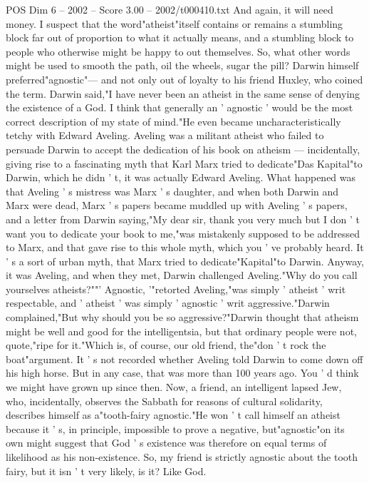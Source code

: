 \begin{textsample}{POS Dim 6 – 2002 – Score 3.00 – 2002/t000410.txt}
And again, it will need money.
I suspect that the word"atheist"itself contains or remains a stumbling block far out of proportion to what it actually means, and a stumbling block to people who otherwise might be happy to out themselves.
So, what other words might be used to smooth the path, oil the wheels, sugar the pill?
Darwin himself preferred"agnostic"— and not only out of loyalty to his friend Huxley, who coined the term.
Darwin said,"I have never been an atheist in the same sense of denying the existence of a God.
I think that generally an ' agnostic ' would be the most correct description of my state of mind."He even became uncharacteristically tetchy with Edward Aveling.
Aveling was a militant atheist who failed to persuade Darwin to accept the dedication of his book on atheism — incidentally, giving rise to a fascinating myth that Karl Marx tried to dedicate"Das Kapital"to Darwin, which he didn ' t, it was actually Edward Aveling.
What happened was that Aveling ' s mistress was Marx ' s daughter, and when both Darwin and Marx were dead, Marx ' s papers became muddled up with Aveling ' s papers, and a letter from Darwin saying,"My dear sir, thank you very much but I don ' t want you to dedicate your book to me,"was mistakenly supposed to be addressed to Marx, and that gave rise to this whole myth, which you ' ve probably heard.
It ' s a sort of urban myth, that Marx tried to dedicate"Kapital"to Darwin.
Anyway, it was Aveling, and when they met, Darwin challenged Aveling."Why do you call yourselves atheists?""' Agnostic, '"retorted Aveling,"was simply ' atheist ' writ respectable, and ' atheist ' was simply ' agnostic ' writ aggressive."Darwin complained,"But why should you be so aggressive?"Darwin thought that atheism might be well and good for the intelligentsia, but that ordinary people were not, quote,"ripe for it."Which is, of course, our old friend, the"don ' t rock the boat"argument.
It ' s not recorded whether Aveling told Darwin to come down off his high horse.
But in any case, that was more than 100 years ago.
You ' d think we might have grown up since then.
Now, a friend, an intelligent lapsed Jew, who, incidentally, observes the Sabbath for reasons of cultural solidarity, describes himself as a"tooth-fairy agnostic."He won ' t call himself an atheist because it ' s, in principle, impossible to prove a negative, but"agnostic"on its own might suggest that God ' s existence was therefore on equal terms of likelihood as his non-existence.
So, my friend is strictly agnostic about the tooth fairy, but it isn ' t very likely, is it?
Like God.

\end{textsample}
